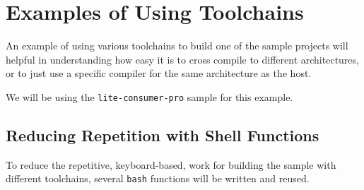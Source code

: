 \section{Examples of Using Toolchains}

An example of using various toolchains to build one of the sample
projects will helpful in understanding how easy it is to cross compile
to different architectures, or to just use a specific compiler for the
same architecture as the host.

We will be using the \texttt{lite-consumer-pro} sample for this
example.

\subsection{Reducing Repetition with Shell Functions}

To reduce the repetitive, keyboard-based, work for building the sample
with different toolchains, several \texttt{bash} functions will be
written and reused.

